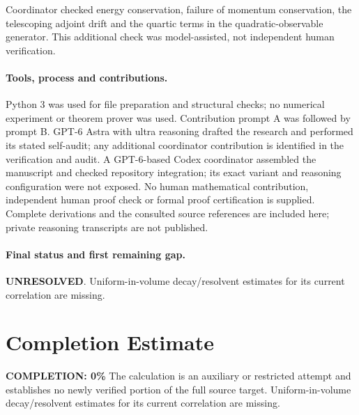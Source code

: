 \documentclass[11pt]{article}
\begin{document}
Coordinator checked energy conservation, failure of momentum conservation, the telescoping adjoint drift and the quartic terms in the quadratic-observable generator. This additional check was model-assisted, not independent human verification.

\paragraph{Tools, process and contributions.}
Python 3 was used for file preparation and structural checks; no numerical experiment or theorem prover was used. Contribution prompt A was followed by prompt B. GPT-6 Astra with ultra reasoning drafted the research and performed its stated self-audit; any additional coordinator contribution is identified in the verification and audit. A GPT-6-based Codex coordinator assembled the manuscript and checked repository integration; its exact variant and reasoning configuration were not exposed. No human mathematical contribution, independent human proof check or formal proof certification is supplied. Complete derivations and the consulted source references are included here; private reasoning transcripts are not published.

\paragraph{Final status and first remaining gap.}
\textbf{UNRESOLVED}. Uniform-in-volume decay/resolvent estimates for its current correlation are missing.

\section{Completion Estimate}
\noindent\textbf{COMPLETION: 0\%}
The calculation is an auxiliary or restricted attempt and establishes no newly verified portion of the full source target. Uniform-in-volume decay/resolvent estimates for its current correlation are missing.
\end{document}

